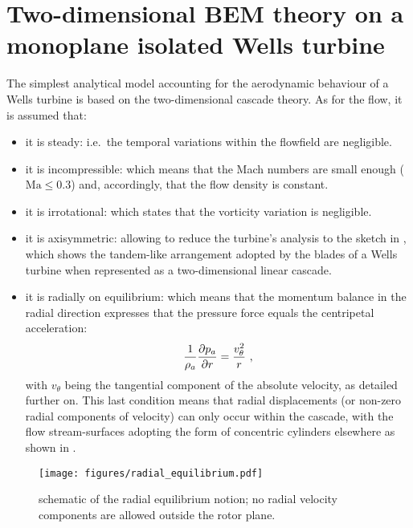 
\section*{Two-dimensional BEM theory on a monoplane isolated Wells turbine}{\label{sec:two-dimensional_BEM_theory_monoplane_isolated_Wells_turbine}}
\noindent The simplest analytical model accounting for the aerodynamic behaviour of a Wells turbine is based on the two-dimensional cascade theory. As for the flow, it is assumed that:
\begin{itemize}
	\item{it is steady: i.e.\ the temporal variations within the flowfield are negligible.}
	\item{it is incompressible: which means that the Mach numbers are small enough ($\text{Ma}\leq0.3$) and, accordingly, that the flow density is constant.}
	\item{it is irrotational: which states that the vorticity variation is negligible.}
	\item{it is axisymmetric: allowing to reduce the turbine's analysis to the sketch in , which shows the tandem-like arrangement adopted by the blades of a Wells turbine when represented as a two-dimensional linear cascade.}
	\item{it is radially on equilibrium: which means that the momentum balance in the radial direction expresses that the pressure force equals the centripetal acceleration:
		\begin{equation}{\label{eq:radial_equilibrium}}
			\frac{1}{\rho_{a}}\frac{\partial{p_{a}}}{\partial{r}} = \frac{v_{\theta}^{2}}{r}\ ,
		\end{equation}
		with $v_{\theta}$ being the tangential component of the absolute velocity, as detailed further on. This last condition means that radial displacements (or non-zero radial components of velocity) can only occur within the cascade, with the flow stream-surfaces adopting the form of concentric cylinders elsewhere as shown in .}
\end{itemize}
\begin{figure}[h!]
	\texttt{[image: figures/radial\_equilibrium.pdf]}
	\caption{schematic of the radial equilibrium notion; no radial velocity components are allowed outside the rotor plane.}
	\label{fig:radial_equilibrium}
\end{figure}

